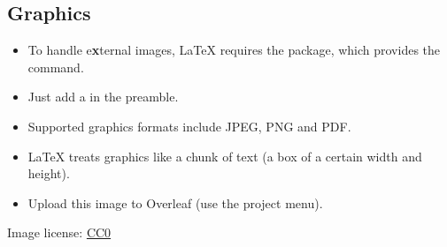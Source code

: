 \documentclass[usenames,dvipsnames]{beamer}
\begin{document}
\subsection{Graphics}
\begin{frame}[fragile]{\insertsubsection}
\begin{itemize}
\item To handle e{\bf x}ternal images, \LaTeX{} requires the  package, which provides the  command. 
\item Just add a  in the preamble.
\item Supported graphics formats include JPEG, PNG and PDF.
\item \LaTeX{} treats graphics like a chunk of text (a box of a certain width and height).
\end{itemize}

\begin{itemize}

\begin{center}
\end{center}

\item Upload this image to Overleaf (use the project menu).

\end{itemize}

\tiny{Image license: \href{https://pixabay.com/en/animal-apple-attractive-beautiful-1239390/}{CC0}}
\end{frame}
\end{document}
